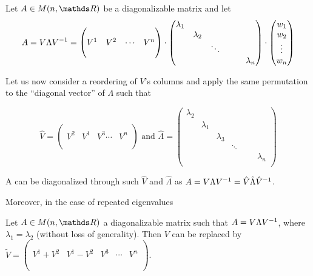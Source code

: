 \documentclass[computationalMathematics.tex]{subfiles}
\begin{document}
\begin{proposition}
  Let $A \in M(n, \R)$ be a diagonalizable matrix and let 
  \[
    A=V\Lambda {V}^{-1} = \begin{pmatrix}
    \\
    V^1 & V^2 & \cdots & V^n\\
    \\
  \end{pmatrix}
  \cdot 
  \begin{pmatrix}
    \lambda_1\\
    &\lambda_2\\
    && \ddots\\
    &&&&&\lambda_n\\
  \end{pmatrix}
  \cdot 
  \begin{pmatrix}
    w_1\\
    w_2\\
    \vdots\\
    w_n\\
  \end{pmatrix}
\]

  Let us now consider a reordering of $V$'s columns and apply the same permutation to the ``diagonal vector'' of $\Lambda$ such that
  
\[
    \hat{V} = \begin{pmatrix}
    \\
    V^2 & V^1 & V^3 \cdots & V^n\\
    \\
  \end{pmatrix}
  \text{ and }
  \hat{\Lambda}= \begin{pmatrix}
    \lambda_2\\
    &\lambda_1\\
    &&\lambda_3\\
    &&& \ddots\\
    &&&&&&\lambda_n\\
  \end{pmatrix}
\]

  A can be diagonalized through such $\hat{V}$ and $\hat{\Lambda}$ as $A = V \Lambda {V}^{-1} = \hat{V} \hat{\Lambda} {\hat{V}}^{-1}$.
\end{proposition}

\noindent Moreover, in the case of repeated eigenvalues

\begin{proposition}
  Let $A \in M(n, \R)$ a diagonalizable matrix such that $A = V \Lambda {V}^{-1}$, where $\lambda_1 = \lambda_2$ (without loss of generality). Then $V$ can be replaced by $\widetilde{V} = \begin{pmatrix}
    \\
    \\
    V^1 + V^2 & V^1 - V^2 & V^3 & \cdots & V^n\\
    \\
    \\
  \end{pmatrix}$.
\end{proposition}
\end{document}
